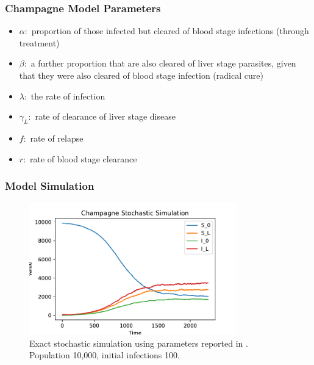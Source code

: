 \documentclass{beamer}
\begin{document}
\begin{frame}
    \frametitle{Champagne Model Parameters}\begin{itemize}
        \item $\alpha:$ proportion of those infected but cleared of blood stage
              infections
              (through treatment)
        \item $\beta:$ a further proportion that are also cleared of liver
              stage parasites,
              given that they were also cleared of blood stage infection
              (radical cure)
        \item $\lambda:$ the rate of infection
        \item $\gamma_L:$ rate of clearance of liver stage disease
        \item $f:$ rate of relapse
        \item $r:$ rate of blood stage clearance
    \end{itemize}
\end{frame}


\begin{frame}
    \frametitle{Model Simulation}
    \begin{figure}
        \centering
        \includegraphics[width=0.8\textwidth]{
            ../../champagne_GP_images/champagne_simulation.pdf
        }
        \caption{
            Exact stochastic simulation using parameters reported in
            \cite{champagne_using_2022}. Population 10,000, initial infections 100.
        }
    \end{figure}
\end{frame}
\end{document}

